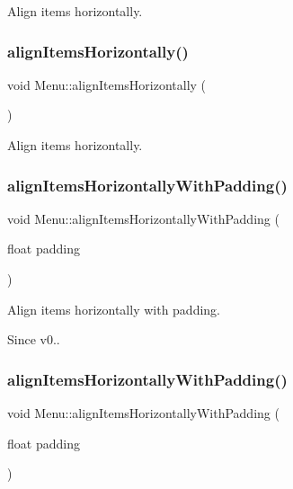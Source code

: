 Align items horizontally. \mbox{\label{classMenu_a9b5aed1fdee862b7d1bc64193c90c2b0}} 
\subsubsection{\texorpdfstring{align\+Items\+Horizontally()}{alignItemsHorizontally()}\hspace{0.1cm}{\footnotesize\ttfamily [2/2]}}
{\footnotesize\ttfamily void Menu\+::align\+Items\+Horizontally (\begin{DoxyParamCaption}{ }\end{DoxyParamCaption})}

Align items horizontally. \mbox{\label{classMenu_afe60c06457d1f0805d17a4db9d2b150b}} 
\subsubsection{\texorpdfstring{align\+Items\+Horizontally\+With\+Padding()}{alignItemsHorizontallyWithPadding()}\hspace{0.1cm}{\footnotesize\ttfamily [1/2]}}
{\footnotesize\ttfamily void Menu\+::align\+Items\+Horizontally\+With\+Padding (\begin{DoxyParamCaption}\item[{float}]{padding }\end{DoxyParamCaption})}

Align items horizontally with padding. \begin{DoxySince}{Since}
v0.. 
\end{DoxySince}
\mbox{\label{classMenu_afe60c06457d1f0805d17a4db9d2b150b}} 
\subsubsection{\texorpdfstring{align\+Items\+Horizontally\+With\+Padding()}{alignItemsHorizontallyWithPadding()}\hspace{0.1cm}{\footnotesize\ttfamily [2/2]}}
{\footnotesize\ttfamily void Menu\+::align\+Items\+Horizontally\+With\+Padding (\begin{DoxyParamCaption}\item[{float}]{padding }\end{DoxyParamCaption})}

